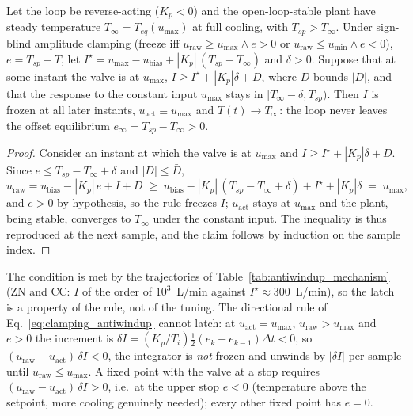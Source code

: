 \begin{proposition}\label{prop:latch}
Let the loop be reverse-acting ($K_p < 0$) and the open-loop-stable plant have steady temperature $T_\infty = T_{eq}(u_{\max})$ at full cooling, with $T_{sp} > T_\infty$. Under sign-blind amplitude clamping (freeze iff $u_{\text{raw}} \ge u_{\max} \wedge e > 0$ or $u_{\text{raw}} \le u_{\min} \wedge e < 0$), $e = T_{sp} - T$, let $I^\star = u_{\max} - u_{\text{bias}} + |K_p|\,(T_{sp} - T_\infty)$ and $\delta > 0$. Suppose that at some instant the valve is at $u_{\max}$, $I \ge I^\star + |K_p|\delta + \bar D$, where $\bar D$ bounds $|D|$, and that the response to the constant input $u_{\max}$ stays in $[T_\infty - \delta, T_{sp})$. Then $I$ is frozen at all later instants, $u_{\text{act}} \equiv u_{\max}$ and $T(t) \to T_\infty$: the loop never leaves the offset equilibrium $e_\infty = T_{sp} - T_\infty > 0$.
\end{proposition}
\begin{proof}
Consider an instant at which the valve is at $u_{\max}$ and $I \ge I^\star + |K_p|\delta + \bar D$. Since $e \le T_{sp} - T_\infty + \delta$ and $|D| \le \bar D$,
\[
u_{\text{raw}} = u_{\text{bias}} - |K_p|\,e + I + D \;\ge\; u_{\text{bias}} - |K_p|\,(T_{sp} - T_\infty + \delta) + I^\star + |K_p|\delta \;=\; u_{\max},
\]
and $e > 0$ by hypothesis, so the rule freezes $I$; $u_{\text{act}}$ stays at $u_{\max}$ and the plant, being stable, converges to $T_\infty$ under the constant input. The inequality is thus reproduced at the next sample, and the claim follows by induction on the sample index.
\end{proof}
The condition is met by the trajectories of Table~\ref{tab:antiwindup_mechanism} (ZN and CC: $I$ of the order of $10^{3}$~L/min against $I^\star \approx 300$~L/min), so the latch is a property of the rule, not of the tuning. The directional rule of Eq.~\eqref{eq:clamping_antiwindup} cannot latch: at $u_{\text{act}} = u_{\max}$, $u_{\text{raw}} > u_{\max}$ and $e > 0$ the increment is $\delta I = (K_p/T_i)\tfrac12(e_k + e_{k-1})\Delta t < 0$, so $(u_{\text{raw}} - u_{\text{act}})\,\delta I < 0$, the integrator is \emph{not} frozen and unwinds by $|\delta I|$ per sample until $u_{\text{raw}} \le u_{\max}$. A fixed point with the valve at a stop requires $(u_{\text{raw}} - u_{\text{act}})\,\delta I > 0$, i.e.\ at the upper stop $e < 0$ (temperature above the setpoint, more cooling genuinely needed); every other fixed point has $e = 0$.

